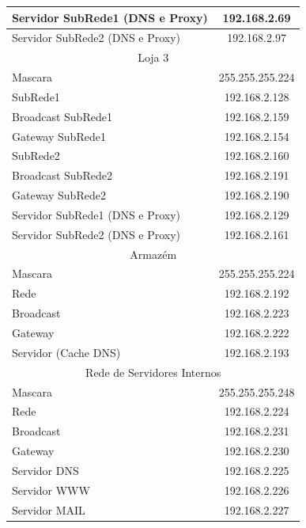 \documentclass[a4paper,12pt]{article}
\begin{document}
\begin{center}
\begin{longtable}{ l | c }
   Servidor SubRede1 (DNS e Proxy) & 192.168.2.69 \\\hline
   Servidor SubRede2 (DNS e Proxy) & 192.168.2.97 \\\hline

   \multicolumn{2}{c}{Loja 3} \\\hline 
   Mascara & 255.255.255.224 \\\hline

   SubRede1 & 192.168.2.128 \\\hline 
   Broadcast SubRede1 & 192.168.2.159 \\\hline
   Gateway SubRede1 & 192.168.2.154\\\hline

   SubRede2 & 192.168.2.160\\\hline 
   Broadcast SubRede2 & 192.168.2.191 \\\hline
   Gateway SubRede2 & 192.168.2.190 \\\hline

   Servidor SubRede1 (DNS e Proxy) & 192.168.2.129 \\\hline
   Servidor SubRede2 (DNS e Proxy) & 192.168.2.161 \\\hline

   \multicolumn{2}{c}{Armazém} \\\hline 
   Mascara & 255.255.255.224 \\\hline
   Rede & 192.168.2.192 \\\hline 
   Broadcast & 192.168.2.223 \\\hline 
   Gateway & 192.168.2.222 \\\hline
   Servidor (Cache DNS) & 192.168.2.193 \\\hline

   \multicolumn{2}{c}{Rede de Servidores Internos} \\\hline 
   Mascara & 255.255.255.248 \\\hline
   Rede & 192.168.2.224 \\\hline 
   Broadcast & 192.168.2.231 \\\hline 
   Gateway & 192.168.2.230 \\\hline
   Servidor DNS & 192.168.2.225 \\\hline
   Servidor WWW & 192.168.2.226 \\\hline
   Servidor MAIL & 192.168.2.227 \\\hline


\end{longtable}
\end{center}
\end{document}
